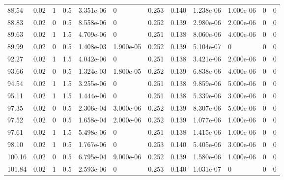 \documentclass[preview]{standalone}
\begin{document}
{{{\begin{tabular}{L{1.2cm}C{1.2cm} C{0.3cm}C{0.5cm} C{1.4cm}C{1.4cm} C{1.4cm}C{1.4cm} C{1.6cm}C{1.6cm} C{1.6cm}C{1.6cm}}
  88.54  &  0.02  & 1     & 0.5 &  3.351e-06  & 0  &  0.253&   0.140& 1.238e-06 & 1.000e-06   &  0 & 0  \\ 
  88.83  &  0.02  & 0     & 0.5 &  8.558e-06  & 0  &  0.252&   0.139& 2.980e-06 & 2.000e-06   &  0 & 0  \\ 
  89.63  &  0.02  & 1     & 1.5 &  4.709e-06  & 0  &  0.251&   0.138& 8.060e-06 & 4.000e-06   &  0 & 0  \\ 
  89.99  &  0.02  & 0     & 0.5 &  1.408e-03  & 1.900e-05  &  0.252&   0.139& 5.104e-07 & 0   &  0 & 0  \\ 
  92.27  &  0.02  & 1     & 1.5 &  4.042e-06  & 0  &  0.251&   0.138& 3.421e-06 & 2.000e-06   &  0 & 0  \\ 
  93.66  &  0.02  & 0     & 0.5 &  1.324e-03  & 1.800e-05  &  0.252&   0.139& 6.838e-06 & 4.000e-06   &  0 & 0  \\ 
  94.54  &  0.02  & 1     & 1.5 &  3.255e-06  & 0  &  0.251&   0.138& 9.859e-06 & 5.000e-06   &  0 & 0  \\ 
  95.11  &  0.02  & 1     & 1.5 &  1.444e-06  & 0  &  0.251&   0.138& 5.339e-06 & 3.000e-06   &  0 & 0  \\ 
  97.35  &  0.02  & 0     & 0.5 &  2.306e-04  & 3.000e-06  &  0.252&   0.139& 8.307e-06 & 5.000e-06   &  0 & 0  \\ 
  97.52  &  0.02  & 0     & 0.5 &  1.658e-04  & 2.000e-06  &  0.252&   0.139& 1.077e-06 & 1.000e-06   &  0 & 0  \\ 
  97.61  &  0.02  & 1     & 1.5 &  5.498e-06  & 0  &  0.251&   0.138& 1.415e-06 & 1.000e-06   &  0 & 0  \\ 
  98.10  &  0.02  & 1     & 0.5 &  1.767e-06  & 0  &  0.253&   0.140& 5.405e-06 & 3.000e-06   &  0 & 0  \\ 
  100.16  &  0.02  & 0     & 0.5 &  6.795e-04  & 9.000e-06  &  0.252&   0.139& 1.580e-06 & 1.000e-06   &  0 & 0  \\ 
  101.84  &  0.02  & 1     & 0.5 &  2.593e-06  & 0  &  0.253&   0.140& 1.031e-07 & 0   &  0 & 0  \\ 
\hline 
\end{tabular} 

}}}
\end{document}
